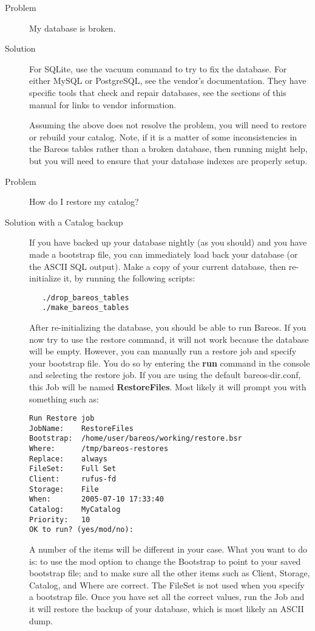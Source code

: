 \begin{description}
\item[Problem]
   My database is broken.
\item[Solution]
   For SQLite, use the vacuum command to try to fix the database. For either
   MySQL or PostgreSQL, see the vendor's documentation. They have specific tools
   that check and repair databases, see the  sections of this manual for links to vendor
   information.

   Assuming the above does not resolve the problem, you will need to restore
   or rebuild your catalog.  Note, if it is a matter of some
   inconsistencies in the Bareos tables rather than a broken database, then
   running  might help, but you will need to ensure
   that your database indexes are properly setup.

\item[Problem]
   How do I restore my catalog?
\item[Solution with a Catalog backup]
   If you have backed up your database nightly (as you should) and you
   have made a bootstrap file, you can immediately load back your
   database (or the ASCII SQL output).  Make a copy of your current
   database, then re-initialize it, by running the following scripts:
\begin{verbatim}
   ./drop_bareos_tables
   ./make_bareos_tables
\end{verbatim}
   After re-initializing the database, you should be able to run
   Bareos. If you now try to use the restore command, it will not
   work because the database will be empty. However, you can manually
   run a restore job and specify your bootstrap file. You do so
   by entering the {\bf run} command in the console and selecting the
   restore job.  If you are using the default bareos-dir.conf, this
   Job will be named {\bf RestoreFiles}. Most likely it will prompt
   you with something such as:

\footnotesize
\begin{verbatim}
Run Restore job
JobName:    RestoreFiles
Bootstrap:  /home/user/bareos/working/restore.bsr
Where:      /tmp/bareos-restores
Replace:    always
FileSet:    Full Set
Client:     rufus-fd
Storage:    File
When:       2005-07-10 17:33:40
Catalog:    MyCatalog
Priority:   10
OK to run? (yes/mod/no):
\end{verbatim}
\normalsize

   A number of the items will be different in your case.  What you want to
   do is: to use the mod option to change the Bootstrap to point to your
   saved bootstrap file; and to make sure all the other items such as
   Client, Storage, Catalog, and Where are correct.  The FileSet is not
   used when you specify a bootstrap file.  Once you have set all the
   correct values, run the Job and it will restore the backup of your
   database, which is most likely an ASCII dump.


\end{description}
